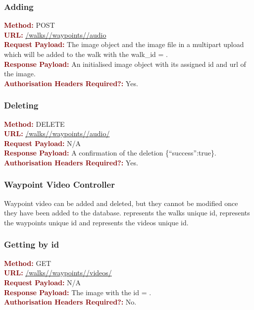 \documentclass[11pt,a4paper]{report}
\begin{document}
\subsubsection{Adding}
\textbf{\textcolor{Maroon}{Method:}} POST\\
\textbf{\textcolor{Maroon}{URL:}} \url{/walks/}\url{/waypoints/}\url{/audio}\\
\textbf{\textcolor{Maroon}{Request Payload:}} The image object and the image file in a multipart upload which will be added to the walk with the walk\_id = .\\
\textbf{\textcolor{Maroon}{Response Payload:}} An initialised image object with its assigned id and url of the image.\\
\textbf{\textcolor{Maroon}{Authorisation Headers Required?:}} Yes.

\subsubsection{Deleting}
\textbf{\textcolor{Maroon}{Method:}} DELETE\\
\textbf{\textcolor{Maroon}{URL:}} \url{/walks/}\url{/waypoints/}\url{/audio/}\\
\textbf{\textcolor{Maroon}{Request Payload:}} N/A\\
\textbf{\textcolor{Maroon}{Response Payload:}} A confirmation of the deletion \{``success'':true\}.\\
\textbf{\textcolor{Maroon}{Authorisation Headers Required?:}} Yes.

\subsubsection{Waypoint Video Controller}
Waypoint video can be added and deleted, but they cannot be modified once they have been added to the database.  represents the walks unique id,  represents the waypoints unique id and  represents the videos unique id. 
 
\subsubsection{Getting by id}
\textbf{\textcolor{Maroon}{Method:}} GET\\
\textbf{\textcolor{Maroon}{URL:}} \url{/walks/}\url{/waypoints/}\url{/videos/}\\
\textbf{\textcolor{Maroon}{Request Payload:}} N/A\\
\textbf{\textcolor{Maroon}{Response Payload:}} The image with the id = .\\
\textbf{\textcolor{Maroon}{Authorisation Headers Required?:}} No.
\end{document}
